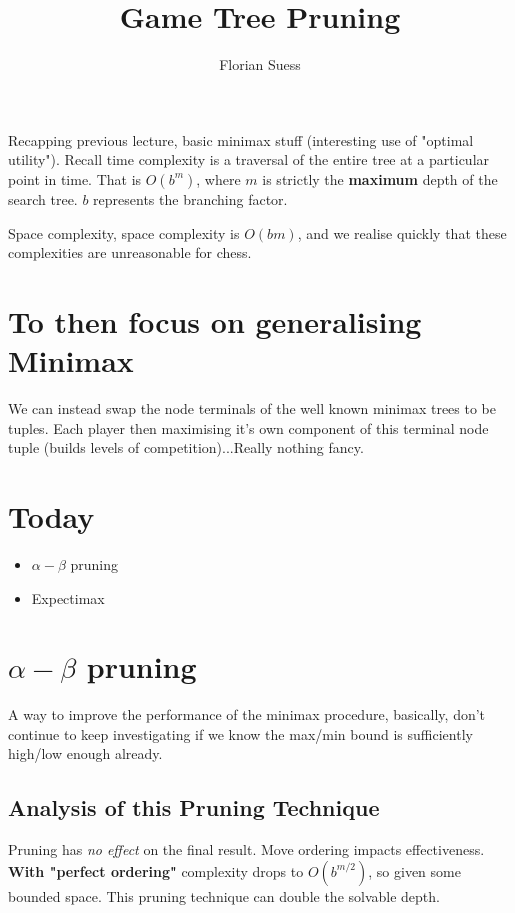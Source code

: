 \documentclass{article}
\begin{document}
\title{Game Tree Pruning}
\date{}
\author{Florian Suess}
\maketitle

Recapping previous lecture, basic minimax stuff (interesting use of "optimal utility"). Recall time complexity is a traversal of the entire tree at a particular point in time. That is $O(b^m)$, where $m$ is strictly the \textbf{maximum} depth of the search tree. $b$ represents the branching factor.

Space complexity, space complexity is $O(bm)$, and we realise quickly that these complexities are unreasonable for chess.

\section*{To then focus on generalising Minimax}
We can instead swap the node terminals of the well known minimax trees to be tuples. Each player then maximising it's own component of this terminal node tuple (builds levels of competition)...Really nothing fancy.

\section*{Today}

\begin{itemize}
	\item{$\alpha-\beta$ pruning}
	\item{Expectimax}
\end{itemize}

\section{$\alpha-\beta$ pruning}
A way to improve the performance of the minimax procedure, basically, don't continue to keep investigating if we know the max/min bound is sufficiently high/low enough already.

\subsection{Analysis of this Pruning Technique}
Pruning has \emph{no effect} on the final result. Move ordering impacts effectiveness. \textbf{With "perfect ordering"} complexity drops to $O(b^{m/2})$, so given some bounded space. This pruning technique can double the solvable depth.
\end{document}
